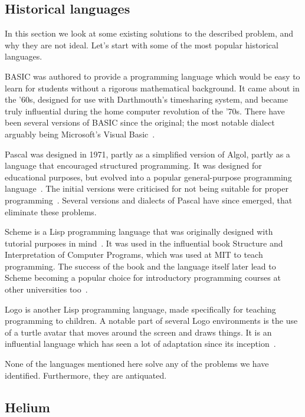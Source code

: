 \subsection{Historical languages}
In this section we look at some existing solutions to the described problem,
and why they are not ideal. Let's start with some of the most popular
historical languages.

BASIC was authored to provide a programming language which would be easy to
learn for students without a rigorous mathematical background. It came about in
the '60s, designed for use with Darthmouth's timesharing system, and became
truly influential during the home computer revolution of the '70s. There have
been several versions of BASIC since the original; the most notable dialect
arguably being Microsoft's Visual Basic~\cite{time2014basic}.

Pascal was designed in 1971, partly as a simplified version of Algol, partly as
a language that encouraged structured programming. It was designed for
educational purposes, but evolved into a popular general-purpose programming
language~\cite{cantu2008essential}. The initial versions were criticised for
not being suitable for proper programming~\cite{kernighan1981pascal}. Several
versions and dialects of Pascal have since emerged\cite{cantu2008essential},
that eliminate these problems.

Scheme is a Lisp programming language that was originally designed with
tutorial purposes in mind~\cite{sussman1998scheme}. It was used in the
influential book Structure and Interpretation of Computer Programs, which was
used at MIT to teach programming. The success of the book and the language
itself later lead to Scheme becoming a popular choice for introductory
programming courses at other universities too~\cite{felleisen2004structure}.

Logo is another Lisp programming language, made specifically for teaching
programming to children. A notable part of several Logo environments is the use
of a turtle avatar that moves around the screen and draws things. It is an
influential language which has seen a lot of adaptation since its
inception~\cite{logo2011whatislogo}.

None of the languages mentioned here solve any of the problems we have
identified. Furthermore, they are antiquated.

\subsection{Helium}

